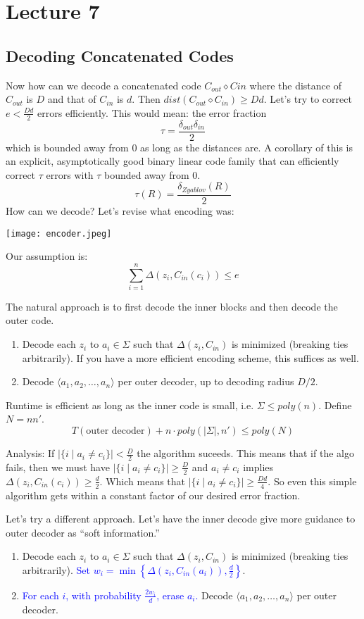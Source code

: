 \section{Lecture 7}

\subsection{Decoding Concatenated Codes}
Now how can we decode a concatenated code $C_{out} \diamond C{in}$ where the distance of $C_{out}$ is $D$ and that of
$C_{in}$ is $d$. Then $dist(C_{out} \diamond C_{in}) \geq Dd$. Let's try to correct $e < \frac{Dd}{2}$ errors efficiently. This would mean:
the error fraction
\[ \tau = \frac{\delta_{out}\delta_{in}}{2} \]
which is bounded away from 0 as long as the distances are. A corollary of this is an explicit, asymptotically good binary
linear code family that can efficiently correct $\tau$ errors with $\tau$ bounded away from 0.
\[ \tau(R) = \frac{\delta_{Zyablov}(R)}{2} \]
How can we decode? Let's revise what encoding was:

\texttt{[image: encoder.jpeg]}

Our assumption is:
\[ \sum_{i = 1}^n \Delta(z_i, C_{in}(c_i)) \leq e \]

The natural approach is to first decode the inner blocks and then decode the outer code.
\begin{enumerate}
    \item Decode each $z_i$ to $a_i \in \Sigma$ such that $\Delta(z_i, C_{in})$ is minimized (breaking ties arbitrarily). If you have a
    more efficient encoding scheme, this suffices as well.
    \item Decode $\langle a_1, a_2, \dots, a_n \rangle$ per outer decoder, up to decoding radius $D/2$.
\end{enumerate}

Runtime is efficient as long as the inner code is small, i.e. $\Sigma \leq poly(n)$. Define $N = nn'$.
\[ T(\text{outer decoder}) + n \cdot poly(|\Sigma|, n') \leq poly(N) \]

Analysis: If $|\{i \mid a_i \neq c_i \}| < \frac{D}{2}$ the algorithm suceeds. This means that if
the algo fails, then we must have $|\{i \mid a_i \neq c_i \}| \geq \frac{D}{2}$ and $a_i \neq c_i$ implies
$\Delta(z_i, C_{in}(c_i)) \geq \frac{d}{2}$. Which means that $|\{i \mid a_i \neq c_i \}| \geq \frac{D d}{4}$.
So even this simple algorithm gets within a constant factor of our desired error fraction.

Let's try a different approach. Let's have the inner decode give more guidance to outer decoder as ``soft information.''
\begin{enumerate}
    \item Decode each $z_i$ to $a_i \in \Sigma$ such that $\Delta(z_i, C_{in})$ is minimized (breaking ties arbitrarily). \textcolor{blue}{Set $w_i = \min\left\{\Delta(z_i, C_{in}(a_i)), \frac{d}{2}\right\}$}.
    \item \textcolor{blue}{For each $i$, with probability $\frac{2w_i}{d}$, erase $a_i$.} Decode $\langle a_1, a_2, \dots, a_n \rangle$ per outer decoder.
\end{enumerate}

